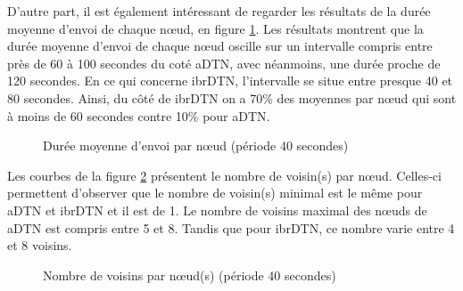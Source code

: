 \documentclass[a4paper,10pt]{article}
\begin{document}
D’autre part, il est également intéressant de regarder les résultats de la durée moyenne d'envoi de chaque nœud, en figure \ref{fig:40_avg_snd_duration}. Les résultats montrent que la durée moyenne d'envoi de chaque nœud oscille sur un intervalle compris entre près de 60 à 100 secondes du coté aDTN, avec néanmoins, une durée proche de 120 secondes. En ce qui concerne ibrDTN, l’intervalle se situe entre presque 40 et 80 secondes. Ainsi, du côté de ibrDTN on a 70\% des moyennes par nœud qui sont à moins de 60 secondes contre 10\% pour aDTN.\par

\begin{figure}[h!]
    \centering
    \caption{Durée moyenne d'envoi par nœud (période 40 secondes)}
    \label{fig:40_avg_snd_duration}
\end{figure}

Les courbes de la figure \ref{fig:40_nb_neighbors} présentent le nombre de voisin(s) par nœud. Celles-ci permettent d'observer que le nombre de voisin(s) minimal est le même pour aDTN et ibrDTN et il est de 1. Le nombre de voisins maximal des nœuds de aDTN est compris entre 5 et 8. Tandis que pour ibrDTN, ce nombre varie entre 4 et 8 voisins.

\begin{figure}[h!]
    \centering
    \caption{Nombre de voisins par nœud(s) (période 40 secondes)}
    \label{fig:40_nb_neighbors}
\end{figure}
\end{document}
